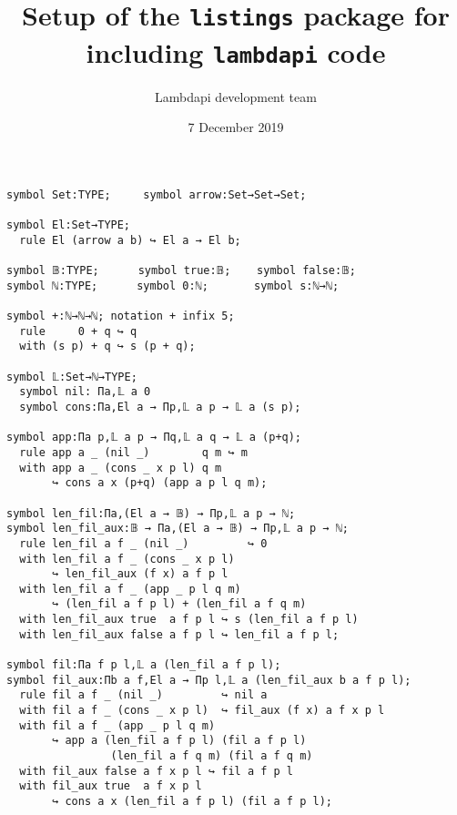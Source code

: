 \documentclass{article}
\title{Setup of the {\tt listings} package for including {\tt lambdapi} code}
\author{Lambdapi development team}
\date{7 December 2019}
\begin{document}
\maketitle

\small
\begin{lstlisting}
symbol Set:TYPE;     symbol arrow:Set→Set→Set;

symbol El:Set→TYPE;
  rule El (arrow a b) ↪ El a → El b;

symbol 𝔹:TYPE;      symbol true:𝔹;    symbol false:𝔹;
symbol ℕ:TYPE;      symbol 0:ℕ;       symbol s:ℕ→ℕ;

symbol +:ℕ→ℕ→ℕ; notation + infix 5;
  rule     0 + q ↪ q
  with (s p) + q ↪ s (p + q);

symbol 𝕃:Set→ℕ→TYPE;
  symbol nil: Πa,𝕃 a 0
  symbol cons:Πa,El a → Πp,𝕃 a p → 𝕃 a (s p);

symbol app:Πa p,𝕃 a p → Πq,𝕃 a q → 𝕃 a (p+q);
  rule app a _ (nil _)        q m ↪ m
  with app a _ (cons _ x p l) q m
       ↪ cons a x (p+q) (app a p l q m);

symbol len_fil:Πa,(El a → 𝔹) → Πp,𝕃 a p → ℕ;
symbol len_fil_aux:𝔹 → Πa,(El a → 𝔹) → Πp,𝕃 a p → ℕ;
  rule len_fil a f _ (nil _)         ↪ 0
  with len_fil a f _ (cons _ x p l)
       ↪ len_fil_aux (f x) a f p l
  with len_fil a f _ (app _ p l q m)
       ↪ (len_fil a f p l) + (len_fil a f q m)
  with len_fil_aux true  a f p l ↪ s (len_fil a f p l)
  with len_fil_aux false a f p l ↪ len_fil a f p l;

symbol fil:Πa f p l,𝕃 a (len_fil a f p l);
symbol fil_aux:Πb a f,El a → Πp l,𝕃 a (len_fil_aux b a f p l);
  rule fil a f _ (nil _)         ↪ nil a
  with fil a f _ (cons _ x p l)  ↪ fil_aux (f x) a f x p l
  with fil a f _ (app _ p l q m)
       ↪ app a (len_fil a f p l) (fil a f p l)
                (len_fil a f q m) (fil a f q m)
  with fil_aux false a f x p l ↪ fil a f p l
  with fil_aux true  a f x p l
       ↪ cons a x (len_fil a f p l) (fil a f p l);
\end{lstlisting}
\end{document}
